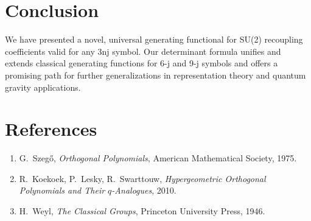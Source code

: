 \documentclass[11pt]{article}
\begin{document}
\section{Conclusion}
We have presented a novel, universal generating functional for SU(2) recoupling coefficients valid
for any 3nj symbol. Our determinant formula unifies and extends classical generating functions for
6-j and 9-j symbols and offers a promising path for further generalizations in representation theory
and quantum gravity applications.

\section*{References}
\begin{enumerate}
  \item G.~Szeg\H{o}, \emph{Orthogonal Polynomials}, American Mathematical Society, 1975.
  \item R.~Koekoek, P.~Lesky, R.~Swarttouw, \emph{Hypergeometric Orthogonal Polynomials and Their $q$-Analogues}, 2010.
  \item H.~Weyl, \emph{The Classical Groups}, Princeton University Press, 1946.
\end{enumerate}
\end{document}
